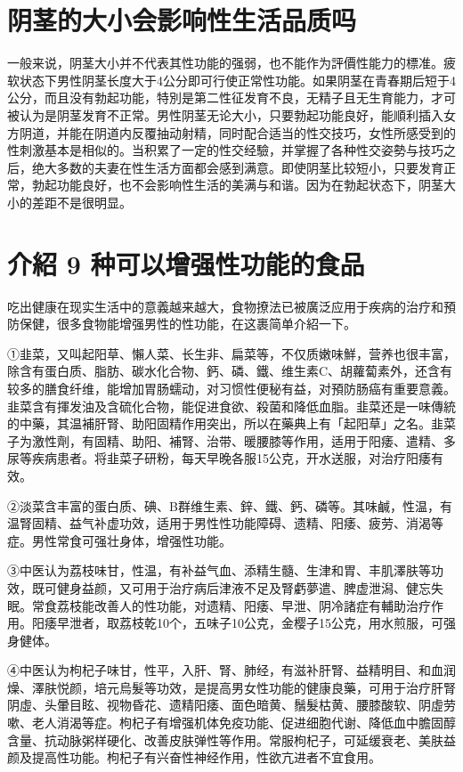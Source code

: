\documentclass[12pt,UTF8]{ctexbook}
\begin{document}
\section{阴茎的大小会影响性生活品质吗}

一般来说，阴茎大小并不代表其性功能的强弱，也不能作为評價性能力的標准。疲软状态下男性阴茎长度大于4公分即可行使正常性功能。如果阴茎在青春期后短于4公分，而且没有勃起功能，特別是第二性征发育不良，无精子且无生育能力，才可被认为是阴茎发育不正常。男性阴茎无论大小，只要勃起功能良好，能順利插入女方阴道，并能在阴道内反覆抽动射精，同时配合适当的性交技巧，女性所感受到的性刺激基本是相似的。当积累了一定的性交经驗，并掌握了各种性交姿勢与技巧之后，绝大多数的夫妻在性生活方面都会感到满意。即使阴茎比较短小，只要发育正常，勃起功能良好，也不会影响性生活的美满与和谐。因为在勃起状态下，阴茎大小的差距不是很明显。

\section{介紹 9 种可以增强性功能的食品}

吃出健康在现实生活中的意義越来越大，食物撩法已被廣泛应用于疾病的治疗和預防保健，很多食物能增强男性的性功能，在这裹简单介紹一下。

①韭菜，又叫起阳草、懶人菜、长生非、扁菜等，不仅质嫩味鮮，营养也很丰富，除含有蛋白质、脂肪、碳水化合物、鈣、磷、鐵、维生素C、胡蘿蔔素外，还含有较多的膳食纤维，能增加胃肠蠕动，对习惯性便秘有益，对預防肠癌有重要意義。韭菜含有揮发油及含硫化合物，能促进食欲、殺菌和降低血脂。韭菜还是一味傳統的中藥，其温補肝腎、助阳固精作用突出，所以在藥典上有「起阳草」之名。韭菜子为激性劑，有固精、助阳、補腎、治带、暖腰膝等作用，适用于阳痿、遣精、多尿等疾病患者。将韭菜子研粉，每天早晚各服15公克，开水送服，对治疗阳痿有效。

②淡菜含丰富的蛋白质、碘、B群维生素、鋅、鐵、鈣、磷等。其味鹹，性温，有温腎固精、益气补虚功效，适用于男性性功能障碍、遗精、阳痿、疲劳、消渴等症。男性常食可强壮身体，增强性功能。

③中医认为荔枝味甘，性温，有补益气血、添精生髓、生津和胃、丰肌澤肤等功效，既可健身益颜，又可用于治疗病后津液不足及腎虧夢遣、脾虚泄潟、健忘失眠。常食荔枝能改善人的性功能，对遗精、阳痿、早泄、阴冷諸症有輔助治疗作用。阳痿早泄者，取荔枝乾10个，五味子10公克，金樱子15公克，用水煎服，可强身健体。

④中医认为枸杞子味甘，性平，入肝、腎、肺经，有滋补肝腎、益精明目、和血润燥、澤肤悦颜，培元烏髮等功效，是提高男女性功能的健康良藥，可用于治疗肝腎阴虛、头暈目眩、视物昏花、遗精阳痿、面色暗黄、鬚髮枯黄、腰膝酸软、阴虛劳嗽、老人消渴等症。枸杞子有增强机体免疫功能、促进细胞代谢、降低血中膽固醇含量、抗动脉粥样硬化、改善皮肤弹性等作用。常服枸杞子，可延缓衰老、美肤益颜及提高性功能。枸杞子有兴奋性神经作用，性欲亢进者不宜食用。
\end{document}
